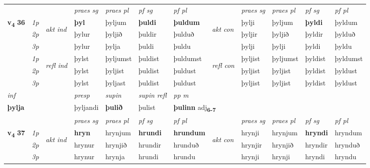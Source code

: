 \begin{longtable}[l]{X>{\footnotesize\itshape}llXXXXlXXXX}
 & &   & \textit{praes sg}  & \textit{praes pl}    & \textit{ pf sg} & \textit{pf pl} & & \textit{praes sg}  & \textit{praes pl}    & \textit{pf sg} & \textit{pf pl }  \\ \cmidrule{4-7} \cmidrule{9-12}
 \multirow{2}{*}{{{\textbf{v{\textsubscript{4}}} \Large{\textbf{36}}}}}  & 1p & \multirow{3}{*}{\begin{turn}{90}\textit{akt ind}\end{turn}} & \textbf{þyl} & þyljum & \textbf{þuldi} & \textbf{þuldum} & \multirow{3}{*}{\begin{turn}{90}\textit{akt con}\end{turn}} &þylji & þyljum & \textbf{þyldi} & þyldum\\*
 & 2p &  &  þylur  & þyljið & þuldir & þulduð & & þyljir & þyljið & þyldir & þylduð \\*
 & 3p &  & þylur & þylja & þuldi & þuldu & & þylji & þylji& þyldi & þyldu \\*
\cmidrule{4-7} \cmidrule{9-12}
 & 1p & \multirow{3}{*}{\begin{turn}{90}\textit{refl ind}\end{turn}}  & þylst & þyljumst & þuldist & þuldumst & \multirow{3}{*}{\begin{turn}{90}\textit{refl con}\end{turn}}  &þyljist & þyljumst & þyldist & þyldumst \\*
 & 2p &  & þylst & þyljist & þuldist & þuldust & &þyljist & þyljist & þyldist & þyldust \\*
 & 3p  & & þylst & þyljast & þuldist & þuldust & & þyljist & þyljist& þyldist & þyldust \\*
\cmidrule{4-7} \cmidrule{9-12}

   {\textit{inf}} & &     & \textit{presp} & \textit{supin} & \textit{supin refl} & \textit{pp m} \\*
  {\textbf{þylja}} & &     & þyljandi &  \textbf{þulið} & þulist & \multicolumn{2}{l}{\textbf{þulinn} adj\textbf{\textsubscript{6-7}}} \\*

\midrule

 & &   & \textit{praes sg}  & \textit{praes pl}    & \textit{ pf sg} & \textit{pf pl} & & \textit{praes sg}  & \textit{praes pl}    & \textit{pf sg} & \textit{pf pl }  \\ \cmidrule{4-7} \cmidrule{9-12}
 \multirow{2}{*}{{{\textbf{v{\textsubscript{4}}} \Large{\textbf{37}}}}}  & 1p & \multirow{3}{*}{\begin{turn}{90}\textit{akt ind}\end{turn}} & \textbf{hryn} & hrynjum & \textbf{hrundi} & \textbf{hrundum} & \multirow{3}{*}{\begin{turn}{90}\textit{akt con}\end{turn}} &hrynji & hrynjum & \textbf{hryndi} & hryndum\\*
 & 2p &  &  hrynur  & hrynjið & hrundir & hrunduð & & hrynjir & hrynjið & hryndir & hrynduð \\*
 & 3p &  & hrynur & hrynja & hrundi & hrundu & & hrynji & hrynji& hryndi & hryndu \\*
\cmidrule{4-7} \cmidrule{9-12}


\end{longtable}
